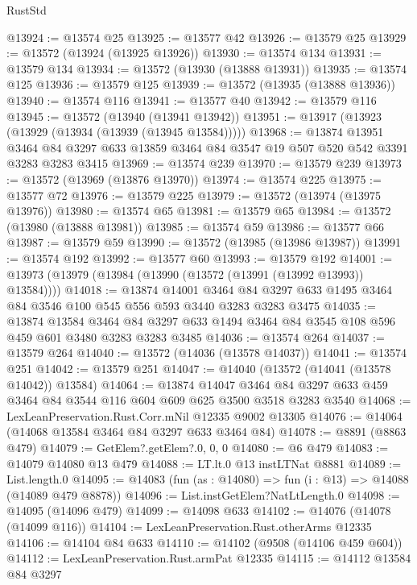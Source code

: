 \begin{lexlean}{RustStd}
\begin{coremodule}
@13924 := @13574 @25
@13925 := @13577 @42
@13926 := @13579 @25
@13929 := @13572 (@13924 (@13925 @13926))
@13930 := @13574 @134
@13931 := @13579 @134
@13934 := @13572 (@13930 (@13888 @13931))
@13935 := @13574 @125
@13936 := @13579 @125
@13939 := @13572 (@13935 (@13888 @13936))
@13940 := @13574 @116
@13941 := @13577 @40
@13942 := @13579 @116
@13945 := @13572 (@13940 (@13941 @13942))
@13951 := @13917 (@13923 (@13929 (@13934 (@13939 (@13945 @13584)))))
@13968 := @13874
    @13951
    @3464
    @84
    @3297
    @633
    @13859
    @3464
    @84
    @3547
    @19
    @507
    @520
    @542
    @3391
    @3283
    @3283
    @3415
@13969 := @13574 @239
@13970 := @13579 @239
@13973 := @13572 (@13969 (@13876 @13970))
@13974 := @13574 @225
@13975 := @13577 @72
@13976 := @13579 @225
@13979 := @13572 (@13974 (@13975 @13976))
@13980 := @13574 @65
@13981 := @13579 @65
@13984 := @13572 (@13980 (@13888 @13981))
@13985 := @13574 @59
@13986 := @13577 @66
@13987 := @13579 @59
@13990 := @13572 (@13985 (@13986 @13987))
@13991 := @13574 @192
@13992 := @13577 @60
@13993 := @13579 @192
@14001 := @13973 (@13979 (@13984 (@13990 (@13572 (@13991 (@13992 @13993)) @13584))))
@14018 := @13874
    @14001
    @3464
    @84
    @3297
    @633
    @1495
    @3464
    @84
    @3546
    @100
    @545
    @556
    @593
    @3440
    @3283
    @3283
    @3475
@14035 := @13874
    @13584
    @3464
    @84
    @3297
    @633
    @1494
    @3464
    @84
    @3545
    @108
    @596
    @459
    @601
    @3480
    @3283
    @3283
    @3485
@14036 := @13574 @264
@14037 := @13579 @264
@14040 := @13572 (@14036 (@13578 @14037))
@14041 := @13574 @251
@14042 := @13579 @251
@14047 := @14040 (@13572 (@14041 (@13578 @14042)) @13584)
@14064 := @13874
    @14047
    @3464
    @84
    @3297
    @633
    @459
    @3464
    @84
    @3544
    @116
    @604
    @609
    @625
    @3500
    @3518
    @3283
    @3540
@14068 := LexLeanPreservation.Rust.Corr.mNil @12335 @9002 @13305
@14076 := @14064 (@14068 @13584 @3464 @84 @3297 @633 @3464 @84)
@14078 := @8891 (@8863 @479)
@14079 := GetElem?.getElem?.{0, 0, 0}
@14080 := @6 @479
@14083 := @14079 @14080 @13 @479
@14088 := LT.lt.{0} @13 instLTNat @8881
@14089 := List.length.{0}
@14095 := @14083 (fun (as : @14080) => fun (i : @13) => @14088 (@14089 @479 @8878))
@14096 := List.instGetElem?NatLtLength.{0}
@14098 := @14095 (@14096 @479)
@14099 := @14098 @633
@14102 := @14076 (@14078 (@14099 @116))
@14104 := LexLeanPreservation.Rust.otherArms @12335
@14106 := @14104 @84 @633
@14110 := @14102 (@9508 (@14106 @459 @604))
@14112 := LexLeanPreservation.Rust.armPat @12335
@14115 := @14112 @13584 @84 @3297

\end{coremodule}
\end{lexlean}

